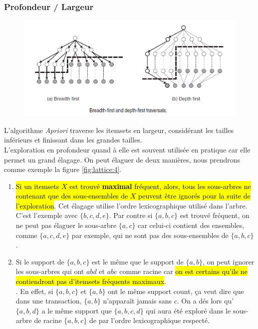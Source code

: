 \documentclass[letterpaper, 12pt]{article}
\newcommand{\alinea}{
\hspace*{0.5cm}}
\newcommand{\myul}[1]{
		\underline{\smash{#1}}
	}
\begin{document}
			\subsubsection{Profondeur / Largeur}
				\begin{figure}[H]
					\centering
					\includegraphics[scale=0.65]{Images/lattice_3}
					\caption{}
					\label{fig:lattice:3}
				\end{figure}\noindent
				\alinea L'algorithme \textit{Apriori} traverse les 
					itemsets en largeur, considérant les tailles
					inférieurs et finissant dans les grandes tailles.\\
				\alinea L'exploration en profondeur quand à elle est souvent
					utilisée en pratique car elle permet un grand élagage. 
					On peut élaguer de deux 
					manières, nous prendrons comme exemple la figure 
					\ref{fig:lattice:4}.
				\begin{enumerate}
					\setlength{\itemsep}{0pt}
					\setlength{\parskip}{0pt}
					\setlength{\parsep}{0pt}
					\item \hl{Si un itemsets $X$ est trouvé \textbf{maximal}
						fréquent, alors,
						tous les sous-arbres ne contenant que des 
						sous-ensembles de $X$ peuvent être ignorés pour 
						la suite de l'exploration}. Cet élagage utilise
						l'ordre lexicographique utilisé dans l'arbre.
						C'est l'exemple avec $\{b, c, d, e\}$. Par contre
						si $\{a, b, c\}$ est trouvé fréquent, on ne peut
						pas élaguer le sous-arbre $\{a, c\}$ car celui-ci
						contient des ensembles, comme $\{a, c, d, e\}$ 
						par exemple, qui ne sont pas des sous-ensembles de
						$\{a, b, c\}$.
					\item Si le support de $\{a, b, c\}$ est le même 
						que le support de $\{a, b\}$, on peut ignorer
						les sous-arbres qui ont $abd$ et $abe$ comme
						racine car \hl{on est certains qu'ils ne contiendront 
						pas d'itemsets fréquents maximaux}.\\
						\myul{\textbf{\hl{On peut le prouver}}}. En effet,
						si $\{a, b, c\}$ et $\{a, b\}$ ont le même support 
						count, ça veut dire que dans une transaction,
						$\{a, b\}$ n'apparaît jamais sans $c$. On a dés lors
						qu'$\{a, b, d\}$ a le même support que 
						$\{a, b, c, d\}$ qui aura été exploré dans le 
						sous-arbre de racine $\{a, b, c\}$ de par l'ordre 
						lexicographique respecté.
				\end{enumerate}
				
\end{document}
